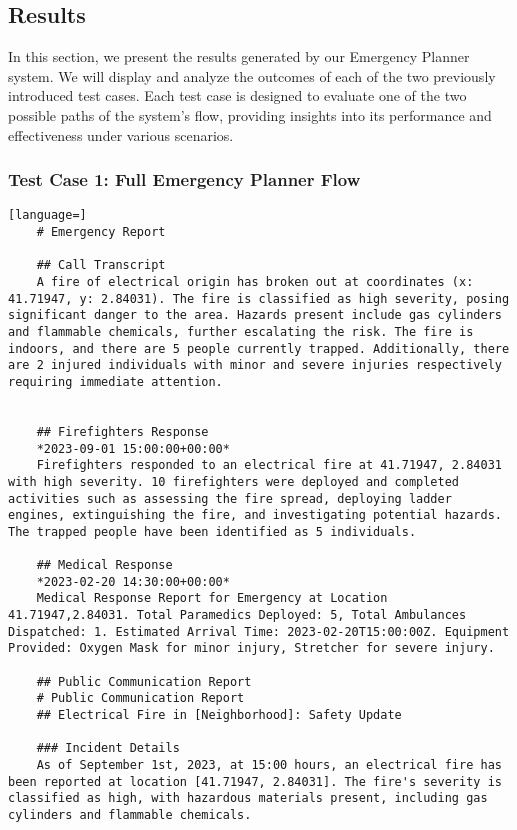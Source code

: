 \subsection{Results}\label{subsec:results}
In this section, we present the results generated by our Emergency Planner system. We will display and analyze the outcomes of each of the two previously introduced test cases. Each test case is designed to evaluate one of the two possible paths of the system's flow, providing insights into its performance and effectiveness under various scenarios.

\subsubsection{Test Case 1: Full Emergency Planner Flow}
\begin{lstlisting}[language=]
    # Emergency Report

    ## Call Transcript
    A fire of electrical origin has broken out at coordinates (x: 41.71947, y: 2.84031). The fire is classified as high severity, posing significant danger to the area. Hazards present include gas cylinders and flammable chemicals, further escalating the risk. The fire is indoors, and there are 5 people currently trapped. Additionally, there are 2 injured individuals with minor and severe injuries respectively requiring immediate attention.


    ## Firefighters Response
    *2023-09-01 15:00:00+00:00*
    Firefighters responded to an electrical fire at 41.71947, 2.84031 with high severity. 10 firefighters were deployed and completed activities such as assessing the fire spread, deploying ladder engines, extinguishing the fire, and investigating potential hazards. The trapped people have been identified as 5 individuals.

    ## Medical Response
    *2023-02-20 14:30:00+00:00*
    Medical Response Report for Emergency at Location 41.71947,2.84031. Total Paramedics Deployed: 5, Total Ambulances Dispatched: 1. Estimated Arrival Time: 2023-02-20T15:00:00Z. Equipment Provided: Oxygen Mask for minor injury, Stretcher for severe injury.

    ## Public Communication Report
    # Public Communication Report
    ## Electrical Fire in [Neighborhood]: Safety Update

    ### Incident Details
    As of September 1st, 2023, at 15:00 hours, an electrical fire has been reported at location [41.71947, 2.84031]. The fire's severity is classified as high, with hazardous materials present, including gas cylinders and flammable chemicals.


\end{lstlisting}
